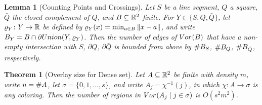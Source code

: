 \documentclass[10pt,a4paper]{amsart}
\newtheorem{lemma}{Lemma}
\newtheorem{theorem}{Theorem}
\newcommand{\Edist}[2]      {\mm{\|{#1}-{#2}\|}}
\newcommand{\Overlay}[3]    {\mm{{\rm Vor}_{#1}{({#2}\mid{#3})}}}
\newcommand{\Rspace}        {\mm{{\mathbb R}}}
\newcommand{\Union}[2]      {\mm{\rm Union}{({#1},{#2})}}
\newcommand{\Voronoi}[2]    {\mm{{\rm Vor}_{#1}{({#2})}}}
\newcommand{\card}[1]       {\mm{{\#}{#1}}}
\newcommand {\mm}[1]   {\ifmmode{#1}\else{\mbox{\(#1\)}}\fi}
\begin{document}
\begin{lemma}[Counting Points and Crossings]
  \label{lem:counting_points_and_crossings}
  Let $S$ be a line segment, $Q$ a square, $\bar{Q}$ the closed complement of $Q$, and $B \subseteq \Rspace^2$ finite.
  For $Y \in \{ S, Q, \bar{Q} \}$, let $\varrho_Y \colon Y \to \Rspace$ be defined by $\varrho_Y (x) = \min_{a \in B} \Edist{x}{a}$, and write $B_Y = B \cap \partial \Union{Y}{\varrho_Y}$.
  Then the number of edges of $\Voronoi{}{B}$ that have a non-empty intersection with $S$, $\partial Q$, $\partial \bar{Q}$ is bounded from above by $\card{B_S}$, $\card{B_Q}$, $\card{B_{\bar{Q}}}$, respectively.
\end{lemma}

\begin{theorem}[Overlay size for Dense set]\label{thm:overlay_size_for_dense_set}
  Let $A \subseteq \Rspace^2$ be finite with density $m$, write $n = \card{A}$, let $\sigma = \{0,1,\ldots,s\}$, and write $A_j = \chi^{-1} (j)$, in which $\chi \colon A \to \sigma$ is any coloring.
  Then the number of regions in $\Overlay{}{A_j}{j \in \sigma}$ is $O(s^2 m^2)$.
\end{theorem}
\end{document}
